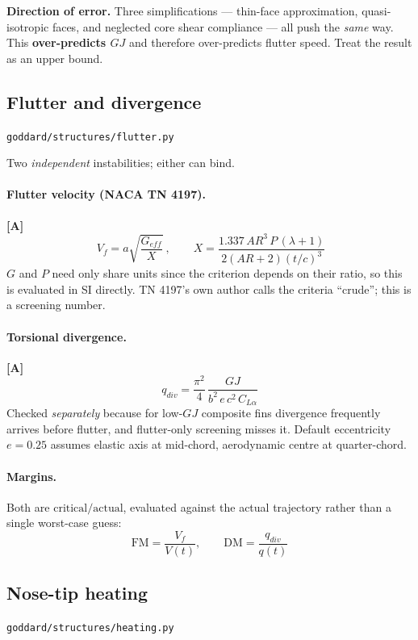 \documentclass[11pt,a4paper]{article}
\newcommand{\approxi}{\textcolor{amber}{\textbf{[A]}}\xspace}
\newcommand{\src}[1]{\hfill{\footnotesize\texttt{#1}}}
\begin{document}
\medskip
\noindent\textbf{Direction of error.} Three simplifications --- thin-face
approximation, quasi-isotropic faces, and neglected core shear compliance ---
all push the \emph{same} way. This \textbf{over-predicts $GJ$} and therefore
over-predicts flutter speed. Treat the result as an upper bound.

\subsection{Flutter and divergence}
\src{goddard/structures/flutter.py}

Two \emph{independent} instabilities; either can bind.

\paragraph{Flutter velocity (NACA TN 4197).} \approxi
\begin{equation}
\boxed{\ V_f = a\sqrt{\frac{G_{eff}}{X}}\ }, \qquad
X = \frac{1.337\,AR^3\,P\,(\lambda+1)}{2(AR+2)(t/c)^3}
\end{equation}
$G$ and $P$ need only share units since the criterion depends on their ratio, so
this is evaluated in SI directly. TN 4197's own author calls the criteria
``crude''; this is a screening number.

\paragraph{Torsional divergence.} \approxi
\begin{equation}
\boxed{\ q_{div} = \frac{\pi^2}{4}\,
\frac{GJ}{b^2\, e\, c^2\, C_{L\alpha}}\ }
\end{equation}
Checked \emph{separately} because for low-$GJ$ composite fins divergence
frequently arrives before flutter, and flutter-only screening misses it. Default
eccentricity $e = 0.25$ assumes elastic axis at mid-chord, aerodynamic centre at
quarter-chord.

\paragraph{Margins.} Both are $\text{critical}/\text{actual}$, evaluated against
the actual trajectory rather than a single worst-case guess:
\begin{equation}
\text{FM} = \frac{V_f}{V(t)}, \qquad
\text{DM} = \frac{q_{div}}{q(t)}
\end{equation}

\subsection{Nose-tip heating}
\src{goddard/structures/heating.py}
\end{document}
